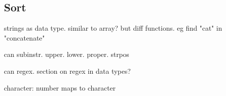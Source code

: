 
\subsection{Sort}

strings as data type. similar to array? but diff functions. eg find "cat" in "concatenate"

can subinstr. upper. lower. proper. strpos

can regex. section on regex in data types?

character: number maps to character


